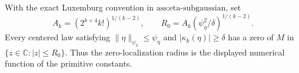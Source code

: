 With the exact Luxemburg convention in \(\text{ass:eta-subgaussian}\), set
\[
 A_k=(2^{k+4}k!)^{1/(k-2)},
 \qquad
 R_0=A_k(\psi_{\eta}^2/\delta)^{1/(k-2)}.
\]
Every centered law satisfying \(\|\eta\|_{\psi_2}\le\psi_{\eta}\) and \(|\kappa_k(\eta)|\ge\delta\) has a zero of \(M\) in \(\{z\in\mathbb C:|z|\le R_0\}\). Thus the zero-localization radius is the displayed numerical function of the primitive constants.